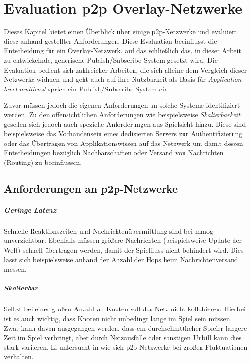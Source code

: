 \chapter{Evaluation p2p Overlay-Netzwerke}
\label{chap:evaluation_p2p}

Dieses Kapitel bietet einen Überblick über einige p2p-Netzwerke und evaluiert diese anhand gestellter Anforderungen. Diese Evaluation beeinflusst die Entscheidung für ein Overlay-Netzwerk, auf das schließlich das, in dieser Arbeit zu entwickelnde, generische Publish/Subscribe-System gesetzt wird. Die Evaluation bedient sich zahlreicher Arbeiten, die sich alleine dem Vergleich dieser Netzwerke widmen \cite{Lua2005Survey, Goetz2005, Li2004Comparing, Darlagiannis2006Peertopeer, Castro2002Secure, Bo2003PeertoPeer} und geht auch auf ihre Nutzbarkeit als Basis für \emph{Application level multicast} sprich ein Publish/Subscribe-System ein \cite{Hosseini2007Survey, Fahmy2007, Castro2003Evaluation, Ratnasamy2001}.

Zuvor müssen jedoch die eigenen Anforderungen an solche Systeme identifiziert werden. Zu den offensichtlichen Anforderungen wie beispielsweise \emph{Skalierbarkeit} gesellen sich jedoch auch spezielle Anforderungen aus Spielsicht hinzu. Diese sind beispielsweise das Vorhandensein eines dedizierten Servers zur Authentifizierung oder das Übertragen von Applikationswissen auf das Netzwerk um damit dessen Entscheidungen bezüglich Nachbarschaften oder Versand von Nachrichten (Routing) zu beeinflussen.

\section{Anforderungen an p2p-Netzwerke}

\paragraph{Geringe Latenz} Schnelle Reaktionszeiten und Nachrichtenübermittlung sind bei \ac{mmog} unverzichtbar. Ebenfalls müssen größere Nachrichten (beispielsweise Update der Welt) schnell übertragen werden, damit der Spielfluss nicht behindert wird. Dies lässt sich beispielsweise anhand der Anzahl der Hops beim Nachrichtenversand messen.

\paragraph{Skalierbar} Selbst bei einer großen Anzahl an Knoten soll das Netz nicht kollabieren. Hierbei ist es auch wichtig, dass Knoten nicht unbedingt lange im Spiel sein müssen. Zwar kann davon ausgegangen werden, dass ein durchschnittlicher Spieler längere Zeit im Spiel verbringt, aber durch Netzausfälle oder sonstigen Unbill kann dies stark variieren. Li untersucht in \cite{Li2004Comparing} wie sich p2p-Netzwerke bei großen Fluktuationen verhalten.

